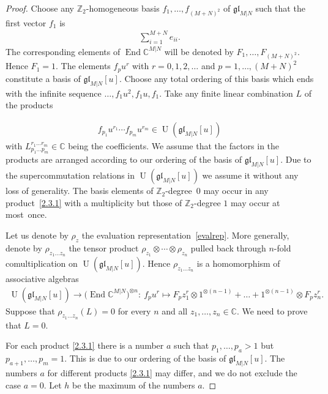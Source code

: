 \documentclass[pdftex]{sigma}
\numberwithin{equation}{section}
\def\CC{{\mathbb{C}}}
\def\CMN{\CC^{M|N}}
\def\End{\operatorname{End}}
\def\g{\glMN [u]}
\def\glMN{\mathfrak{gl}_{M|N}}
\def\ot{\otimes}
\def\Ug{\operatorname{U}(\g)}
\def\ZZ{\mathbb{Z}}
\begin{document}
\begin{proof}
Choose any $\ZZ_2 $-homogeneous
basis $f_1,\dots, f_{(M+N)^2}$ of $\glMN$
such that the first vector $f_1$ is
\begin{gather}\label{esum}
\sum_{i=1}^{M+N}e_{ii} .
\end{gather}
The corresponding elements of $\End\CMN$
will be denoted by $F_1,\dots, F_{(M+N)^2} $.
Hence $F_1=1 $.
The elements $f_{p} u^{r}$
with $r=0 ,1 ,2 , \dots$
and $p=1 ,\dots, (M+N)^2$ constitute a basis of $\g $.
Choose any total ordering of this basis which ends with the
infinite sequence
$\dots , f_1 u^{2}, f_1 u , f_1$.
Take any finite linear combination $L$ of the products{\samepage
\begin{gather}\label{2.3.1}
f_{p_1}u^{r_1}\cdots f_{p_m}u^{r_m}\in\Ug
\end{gather}
with $L_{p_1\dots p_m}^{r_1\dots r_m}\in\CC$
being the coefficients.
We assume that the factors in the products are
arranged according to our ordering of the basis of $\g $.
Due to the supercommutation relations in $\Ug$
we assume it without any loss of generality.
The basis elements of $\ZZ_2 $-degree~$0$
may occur in any product~\eqref{2.3.1} with a multiplicity
but those of $\ZZ_2 $-degree $1$ may occur at most~once.

}

Let us denote by $\rho_z$ the evaluation representation~\eqref{evalrep}.
More generally, denote by $\rho_{z_1\dots z_n}$ the tensor product
$\rho_{z_1}\ot\cdots\ot\rho_{z_n}$
pulled back through $n $-fold comultiplication on $\Ug $.
Hence $\rho_{z_1\dots z_n}$ is a homomorphism of
associative algebras
\begin{gather*}
\Ug\to\big(\End\CMN\big)^{\ot n}\colon \
f_{p} u^{r}\mapsto
F_{p} z_1^{r}\ot1^{\ot (n-1)}+\dots+
1^{\ot (n-1)}\ot F_{p} z_n^{r} .
\end{gather*}
Suppose that $\rho_{z_1\dots z_n}(L)=0$ for every $n$
and all $z_1,\dots, z_n\in\CC $.
We need to prove that $L=0 $.

For each product \eqref{2.3.1} there is a number $a$ such that
$p_1,\dots, p_{a}>1$ but $p_{a+1} ,\dots, p_m=1 $.
This is due to our ordering of the basis of $\g $.
The numbers $a$ for different products
\eqref{2.3.1} may differ, and we do not exclude the case $a=0$.
Let $h$ be the maximum of the numbers $a $.


\end{proof}
\end{document}
